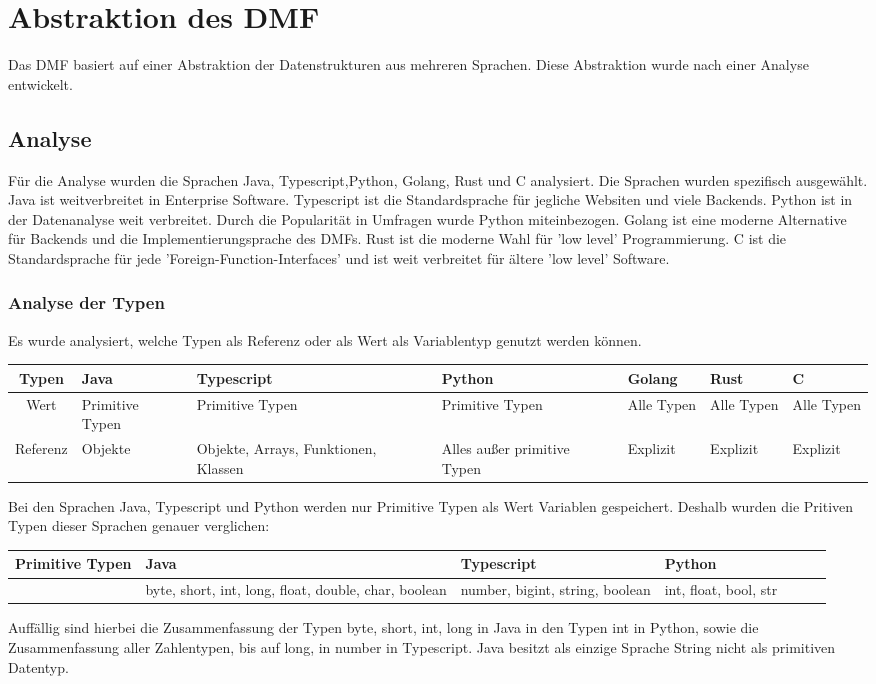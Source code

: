 \documentclass[./einleitung.tex]{subfiles}
\begin{document}
\section{Abstraktion des DMF}
Das DMF basiert auf einer Abstraktion der Datenstrukturen aus mehreren Sprachen.
Diese Abstraktion wurde nach einer Analyse entwickelt.
\subsection{Analyse}
Für die Analyse wurden die Sprachen Java, Typescript,Python, Golang, Rust und C analysiert.
Die Sprachen wurden spezifisch ausgewählt.
Java ist weitverbreitet in Enterprise Software. 
Typescript ist die Standardsprache für jegliche Websiten und viele Backends.
Python ist in der Datenanalyse weit verbreitet. Durch die Popularität in Umfragen wurde Python miteinbezogen.
Golang ist eine moderne Alternative für Backends und die Implementierungsprache des DMFs.
Rust ist die moderne Wahl für 'low level' Programmierung.
C ist die Standardsprache für jede 'Foreign-Function-Interfaces' und ist weit verbreitet für ältere 'low level' Software.
\subsubsection{Analyse der Typen}
Es wurde analysiert, welche Typen als Referenz oder als Wert als Variablentyp genutzt werden können. 
\begin{center}
\begin{tabular}{| c || m{4em} | m{5em} | m{5em} | m{4.5em} | m{4.5em} | m{4.5em} |}
\hline
Typen & Java & Typescript & Python & Golang & Rust & C \\
\hline
Wert & Primitive Typen & Primitive Typen & Primitive Typen & Alle Typen & Alle Typen & Alle Typen \\
\hline
Referenz & Objekte & Objekte, Arrays, Funktionen, Klassen & Alles außer primitive Typen & Explizit & Explizit & Explizit \\
\hline
\end{tabular}
\end{center}
Bei den Sprachen Java, Typescript und Python werden nur Primitive Typen als Wert Variablen gespeichert. Deshalb wurden die Pritiven Typen dieser Sprachen genauer verglichen:
\begin{center}
\begin{tabular}{| c || m{7em} | m{7em} | m{7em} | m{4.5em} | m{4.5em} | m{4.5em} |}
\hline
Primitive Typen & Java & Typescript & Python \\
\hline
 & byte, short, int, long, float, double, char, boolean
 & number, bigint, string, boolean 
 & int, float, bool, str \\
\hline
\end{tabular}
\end{center}
Auffällig sind hierbei die Zusammenfassung der Typen byte, short, int, long in Java in den Typen int in Python, sowie die Zusammenfassung aller Zahlentypen, bis auf long, in number in Typescript.
Java besitzt als einzige Sprache String nicht als primitiven Datentyp.
\end{document}
